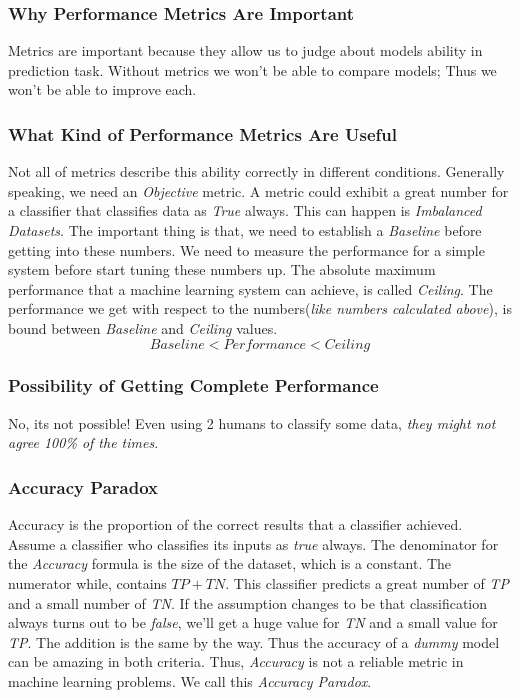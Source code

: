 \documentclass[12pt]{article}
\numberwithin{equation}{section}
\numberwithin{table}{section}
\numberwithin{figure}{section}
\begin{document}
\subsubsection*{Why Performance Metrics Are Important}
Metrics are important because they allow us to judge about models ability in prediction task. Without metrics we won't be able to compare models; Thus we won't be able to improve each.
\subsubsection*{What Kind of Performance Metrics Are Useful}
Not all of metrics describe this ability correctly in different conditions. Generally speaking, we need an \textit{Objective} metric. A metric could exhibit a great number for a classifier that classifies data as \textit{True} always. This can happen is \textit{Imbalanced Datasets}. The important thing is that, we need to establish a \textit{Baseline} before getting into these numbers. We need to measure the performance for a simple system before start tuning these numbers up.
The absolute maximum performance that a machine learning system can achieve, is called \textit{Ceiling}. The performance we get with respect to the numbers(\textit{like numbers calculated above}), is bound between \textit{Baseline} and \textit{Ceiling} values.
\begin{equation}
	Baseline < Performance < Ceiling
\end{equation}
\subsubsection*{Possibility of Getting Complete Performance}
No, its not possible! Even using 2 humans to classify some data, \textit{they might not agree 100\% of the times}.

\subsubsection*{Accuracy Paradox}
Accuracy is the proportion of the correct results that a classifier achieved. Assume a classifier who classifies its inputs as \textit{true} always. The denominator for the \textit{Accuracy} formula is the size of the dataset, which is a constant. The numerator while, contains $TP + TN$. This classifier predicts a great number of \textit{TP} and a small number of \textit{TN}. If the assumption changes to be that classification always turns out to be \textit{false}, we'll get a huge value for \textit{TN} and a small value for \textit{TP}. The addition is the same by the way. Thus the accuracy of a \textit{dummy} model can be amazing in both criteria. Thus, \textit{Accuracy} is not a reliable metric in machine learning problems. We call this \textit{Accuracy Paradox}. 
\end{document}
